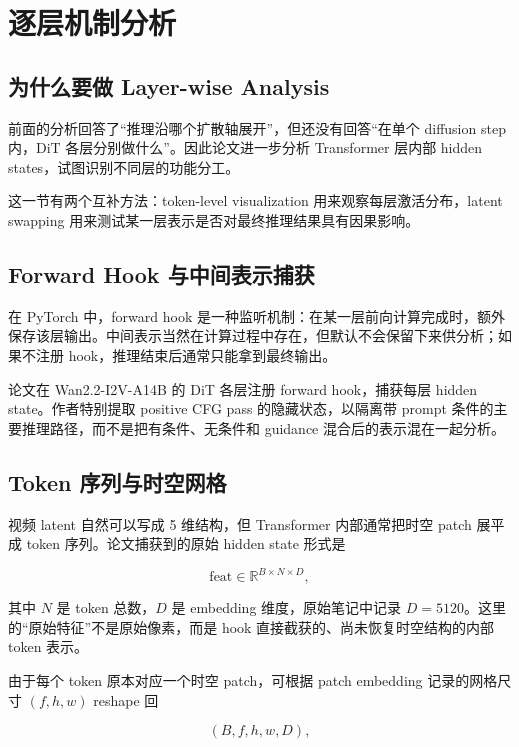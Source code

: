 \section{逐层机制分析}

\subsection{为什么要做 Layer-wise Analysis}

前面的分析回答了“推理沿哪个扩散轴展开”，但还没有回答“在单个 diffusion step 内，DiT 各层分别做什么”。因此论文进一步分析 Transformer 层内部 hidden states，试图识别不同层的功能分工。

这一节有两个互补方法：token-level visualization 用来观察每层激活分布，latent swapping 用来测试某一层表示是否对最终推理结果具有因果影响。

\subsection{Forward Hook 与中间表示捕获}

在 PyTorch 中，forward hook 是一种监听机制：在某一层前向计算完成时，额外保存该层输出。中间表示当然在计算过程中存在，但默认不会保留下来供分析；如果不注册 hook，推理结束后通常只能拿到最终输出。

论文在 Wan2.2-I2V-A14B 的 DiT 各层注册 forward hook，捕获每层 hidden state。作者特别提取 positive CFG pass 的隐藏状态，以隔离带 prompt 条件的主要推理路径，而不是把有条件、无条件和 guidance 混合后的表示混在一起分析。

\subsection{Token 序列与时空网格}

视频 latent 自然可以写成 5 维结构，但 Transformer 内部通常把时空 patch 展平成 token 序列。论文捕获到的原始 hidden state 形式是

\begin{equation}
    \mathrm{feat} \in \mathbb{R}^{B \times N \times D},
\end{equation}

其中 $N$ 是 token 总数，$D$ 是 embedding 维度，原始笔记中记录 $D=5120$。这里的“原始特征”不是原始像素，而是 hook 直接截获的、尚未恢复时空结构的内部 token 表示。

由于每个 token 原本对应一个时空 patch，可根据 patch embedding 记录的网格尺寸 $(f,h,w)$ reshape 回

\begin{equation}
    (B,f,h,w,D),
\end{equation}

